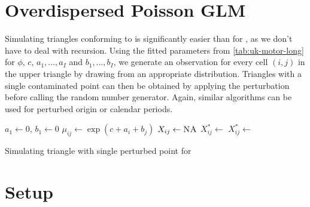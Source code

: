 \documentclass[a4paper]{book}
\begin{document}
\section{Overdispersed Poisson GLM} \label{sec:odp-sim}

Simulating triangles conforming to  is significantly easier than for , as we don't have to deal with recursion. Using the fitted parameters from \cref{tab:uk-motor-long} for $\phi$, $c$, $a_1, \dots, a_I$ and $b_1, \dots, b_I$, we generate an observation for every cell $(i, j)$ in the upper triangle by drawing from an appropriate distribution. Triangles with a single contaminated point can then be obtained by applying the perturbation before calling the random number generator. Again, similar algorithms can be used for perturbed origin or calendar periods.

\begin{algorithm}[!htb]
  \begin{algorithmic}
    \State $a_1 \gets 0$, $b_1 \gets 0$
      \State $\mu_{ij} \gets \exp(c + a_i + b_j)$
      \State $X_{ij} \gets \textsc{NA}$
    \EndFor
          \State $X^*_{ij} \gets$ 
        \Else
          \State $X^*_{ij} \gets$ 
        \EndIf
      \EndFor
    \EndFor
    \State {}
  \end{algorithmic}
  \caption{Simulating triangle with single perturbed point for }
  \label{alg:pert-odp-triangle}
\end{algorithm}

\section{Setup}
\end{document}
